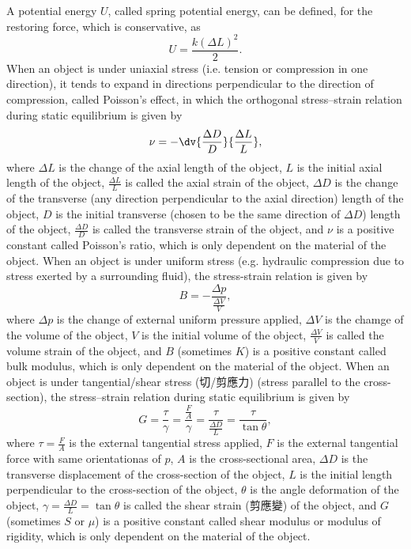 \documentclass[a4paper,12pt]{article}
\begin{document}
A potential energy $U$, called spring potential energy, can be defined, for the restoring force, which is conservative, as
\[U=\frac{k(\Delta L)^2}{2}.\]
When an object is under uniaxial stress (i.e. tension or compression in one direction), it tends to expand in directions perpendicular to the direction of compression, called Poisson's effect, in which the orthogonal stress–strain relation during static equilibrium is given by
\[\nu=-\dv{\frac{\Delta D}{D}}{\frac{\Delta L}{L}},\]
where $\Delta L$ is the change of the axial length of the object, $L$ is the initial axial length of the object, $\frac{\Delta L}{L}$ is called the axial strain of the object, $\Delta D$ is the change of the transverse (any direction perpendicular to the axial direction) length of the object, $D$ is the initial transverse (chosen to be the same direction of $\Delta D$) length of the object, $\frac{\Delta D}{D}$ is called the transverse strain of the object, and $\nu$ is a positive constant called Poisson's ratio, which is only dependent on the material of the object.
When an object is under uniform stress (e.g. hydraulic compression due to stress exerted by a surrounding fluid), the stress-strain relation is given by
\[B=-\frac{\Delta p}{\frac{\Delta V}{V}},\]
where $\Delta p$ is the change of external uniform pressure applied, $\Delta V$ is the chamge of the volume of the object, $V$ is the initial volume of the object, $\frac{\Delta V}{V}$ is called the volume strain of the object, and $B$ (sometimes $K$) is a positive constant called bulk modulus, which is only dependent on the material of the object.
When an object is under tangential/shear stress (切/剪應力) (stress parallel to the cross-section), the stress–strain relation during static equilibrium is given by
\[G=\frac{\tau}{\gamma}=\frac{\frac{F}{A}}{\gamma}=\frac{\tau}{\frac{\Delta D}{L}}=\frac{\tau}{\tan\theta},\]
where $\tau=\frac{F}{A}$ is the external tangential stress applied, $F$ is the external tangential force with same orientationas of $p$, $A$ is the cross-sectional area, $\Delta D$ is the transverse displacement of the cross-section of the object, $L$ is the initial length perpendicular to the cross-section of the object, $\theta$ is the angle deformation of the object, $\gamma=\frac{\Delta D}{L}=\tan\theta$ is called the shear strain (剪應變) of the object, and $G$ (sometimes $S$ or $\mu$) is a positive constant called shear modulus or modulus of rigidity, which is only dependent on the material of the object.
\end{document}
